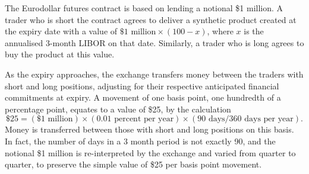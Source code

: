 The Eurodollar futures contract is based on lending a notional \$1 million. A trader who is short the contract agrees to deliver a synthetic product created at the expiry date with a value of $ \$1 \text{ million} \times (100 - x)$, where $x$ is the annualised 3-month LIBOR on that date.  Similarly, a trader who is long agrees to buy the product at this value.

As the expiry approaches, the exchange transfers money between the traders with short and long positions, adjusting for their respective anticipated financial commitments at expiry. A movement of one basis point, one hundredth of a percentage point, equates to a value of \$25, by the calculation
$$ \$25 = (\$1 \text{ million}) \times (0.01 \text{ percent per year}) \times (90 \text{ days}/ 360 \text{ days per year}).$$  Money is transferred between those with short and long positions on this basis.
In fact, the number of days in a 3 month period is not exactly 90, and the notional \$1 million is re-interpreted by the exchange and varied from quarter to quarter, to preserve the simple value of \$25 per basis point movement.         

